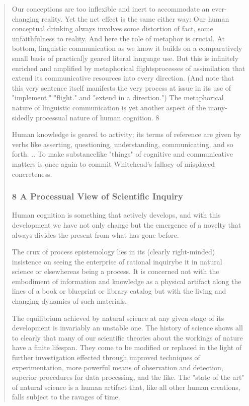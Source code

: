 \documentclass[a4paper]{Thesis}
\begin{document}
	\begin{quotation}
		Our conceptions are too
		inflexible and inert to accommodate an ever-changing reality. Yet the net effect is the
		same either way: Our human conceptual drinking always involves some distortion of fact,
		some unfaithfulness to reality. And here the role of metaphor is crucial. At bottom,
		linguistic communication as we know it builds on a comparatively small basis of
		practical]y geared literal language use. But this is infinitely enriched and amplified by
		metaphorical flightsprocesses of assimilation that extend its communicative resources
		into every direction. (And note that this very sentence itself manifests the very process at
		issue in its use of "implement," "flight." and "extend in a direction.") The metaphorical
		nature of linguistic communication is yet another aspect of the many-sidedly processual
		nature of human cognition. 8
		
		Human knowledge is geared
		to activity; its terms of reference are given by verbs like asserting, questioning,
		understanding, communicating, and so forth.
		..
		To
		make substancelike "things" of cognitive and communicative matters is once again to
		commit Whitehead's fallacy of misplaced concreteness.
		
		\subsubsection{8 A Processual View of Scientific Inquiry}
		Human cognition is something that
		actively develops, and with this development we have not only change but the
		emergence of a novelty that always divides the present from what has gone before.
		
		The crux of process epistemology lies in its (clearly right-minded) insistence on seeing
		the enterprise of rational inquirybe it in natural science or elsewhereas being a process. It
		is concerned not with the embodiment of information and knowledge as a physical
		artifact along the lines of a book or blueprint or library catalog but with the living and
		changing dynamics of such materials.
		
		The equilibrium achieved by natural science at any given stage of its development is
		invariably an unstable one. The history of science shows all to clearly that many of our
		scientific theories about the workings of nature have a finite lifespan. They come to be
		modified or replaced in the light of further investigation effected through improved
		techniques of experimentation, more powerful means of observation and detection, superior procedures
		for data processing, and the like. The "state of the art" of natural science is a human
		artifact that, like all other human creations, falls subject to the ravages of time.
		

\end{quotation}
\end{document}
